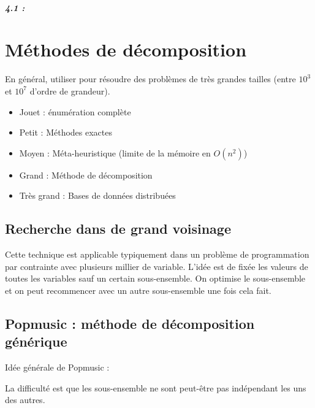 \documentclass[11pt,a4paper]{report}
\begin{document}
\paragraph*{4.1 : }

\chapter{Méthodes de décomposition}

En général, utiliser pour résoudre des problèmes de très grandes tailles (entre $10^3$ et $10^7$ d'ordre de grandeur).
\begin{itemize}
    \item Jouet : énumération complète
    \item Petit : Méthodes exactes
    \item Moyen : Méta-heuristique (limite de la mémoire en $O(n^2)$)
    \item Grand : Méthode de décomposition
    \item Très grand : Bases de données distribuées
\end{itemize}

\section{Recherche dans de grand voisinage}

Cette technique est applicable typiquement dans un problème de programmation par contrainte avec plusieurs millier de variable. L'idée est de fixée les valeurs de toutes les variables sauf un certain sous-ensemble. On optimise le sous-ensemble et on peut recommencer avec un autre sous-ensemble une fois cela fait.

\section{Popmusic : méthode de décomposition générique}

Idée générale de Popmusic :

\begin{algorithm}[H]
\end{algorithm}

La difficulté est que les sous-ensemble ne sont peut-être pas indépendant les uns des autres.
\end{document}
